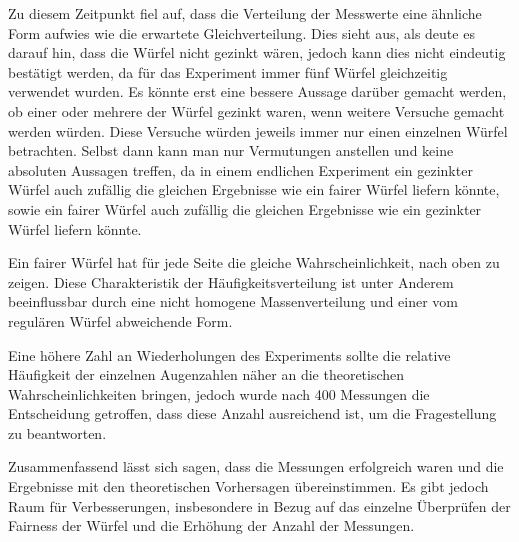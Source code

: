 \documentclass[a4paper,12pt]{article}
\begin{document}
Zu diesem Zeitpunkt fiel auf, dass die Verteilung der Messwerte eine ähnliche Form aufwies wie die 
erwartete Gleichverteilung. Dies sieht aus, als deute es darauf hin, dass die Würfel nicht gezinkt wären, 
jedoch kann dies nicht eindeutig bestätigt werden, da für das Experiment immer fünf Würfel gleichzeitig
verwendet wurden. Es könnte erst eine bessere Aussage darüber gemacht werden, ob einer oder mehrere der Würfel gezinkt waren, 
wenn weitere Versuche gemacht werden würden. Diese Versuche würden jeweils immer nur einen einzelnen Würfel betrachten.
Selbst dann kann man nur Vermutungen anstellen und keine absoluten Aussagen treffen, da in einem endlichen Experiment 
ein gezinkter Würfel auch zufällig die gleichen Ergebnisse wie ein fairer Würfel liefern könnte, sowie ein fairer Würfel 
auch zufällig die gleichen Ergebnisse wie ein gezinkter Würfel liefern könnte.

Ein fairer Würfel hat für jede Seite die gleiche Wahrscheinlichkeit, nach oben zu zeigen. Diese Charakteristik 
der Häufigkeitsverteilung ist unter Anderem beeinflussbar durch eine nicht homogene Massenverteilung und einer vom 
regulären Würfel abweichende Form.

Eine höhere Zahl an Wiederholungen des Experiments sollte die relative Häufigkeit der einzelnen Augenzahlen
näher an die theoretischen Wahrscheinlichkeiten bringen, jedoch wurde nach 400 Messungen die Entscheidung getroffen,
dass diese Anzahl ausreichend ist, um die Fragestellung zu beantworten.

Zusammenfassend lässt sich sagen, dass die Messungen erfolgreich waren und die Ergebnisse 
mit den theoretischen Vorhersagen übereinstimmen. Es gibt jedoch Raum für Verbesserungen, 
insbesondere in Bezug auf das einzelne Überprüfen der Fairness der Würfel und die Erhöhung der Anzahl 
der Messungen.
\end{document}
